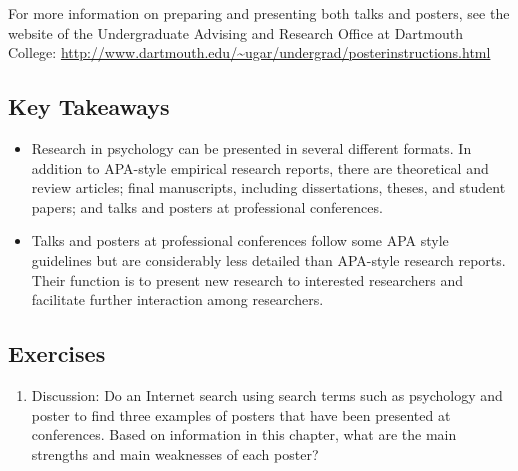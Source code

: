 For more information on preparing and presenting both talks and posters, see the website of the Undergraduate Advising and Research Office at Dartmouth College: \url{http://www.dartmouth.edu/~ugar/undergrad/posterinstructions.html}

\subsection{Key Takeaways}
\begin{fullwidth}
\begin{itemize}
\item Research in psychology can be presented in several different formats. In addition to APA-style empirical research reports, there are theoretical and review articles; final manuscripts, including dissertations, theses, and student papers; and talks and posters at professional conferences.

\item Talks and posters at professional conferences follow some APA style guidelines but are considerably less detailed than APA-style research reports. Their function is to present new research to interested researchers and facilitate further interaction among researchers.

\end{itemize}
\end{fullwidth}



\subsection{Exercises}
\begin{fullwidth}
\begin{enumerate}
\item Discussion: Do an Internet search using search terms such as psychology and poster to find three examples of posters that have been presented at conferences. Based on information in this chapter, what are the main strengths and main weaknesses of each poster?
\end{enumerate}
\end{fullwidth}
